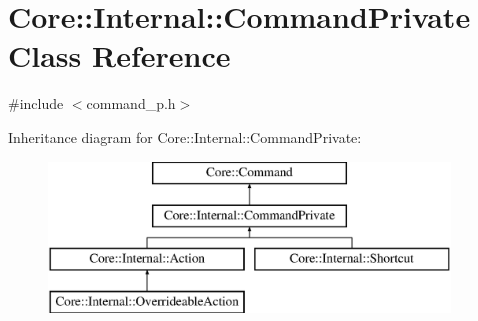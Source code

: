 \hypertarget{class_core_1_1_internal_1_1_command_private}{\section{\-Core\-:\-:\-Internal\-:\-:\-Command\-Private \-Class \-Reference}
\label{class_core_1_1_internal_1_1_command_private}
}


{\ttfamily \#include $<$command\-\_\-p.\-h$>$}

\-Inheritance diagram for \-Core\-:\-:\-Internal\-:\-:\-Command\-Private\-:\begin{figure}[H]
\begin{center}
\leavevmode
\includegraphics[height=4.000000cm]{class_core_1_1_internal_1_1_command_private}
\end{center}
\end{figure}
